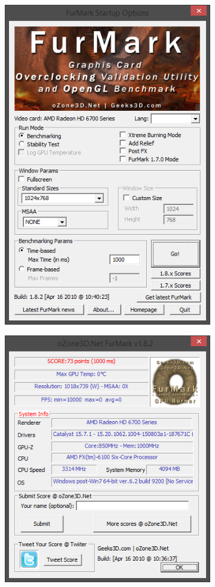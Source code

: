 \documentclass[
	a4paper,
	oneside,
	BCOR = 10mm,
	DIV = 12,
	12pt,
	headings = normal,
]{scrartcl}
\begin{document}
			\begin{figure}[!htbp]
				\centering
				\begin{subfigure}[t]{\columnwidth / 2}
					\centering
					\includegraphics[height=12\baselineskip]{./assets/y03s02-pcdiag-lab-04-p00-furmark-prerun.png}
					\caption{}
					\label{subfig:furmark-prerun}
				\end{subfigure}%
				\begin{subfigure}[t]{\columnwidth / 2}
					\centering
					\includegraphics[height=12\baselineskip]{./assets/y03s02-pcdiag-lab-04-p01-furmark-res.png}

\end{subfigure}
\end{figure}
\end{document}
